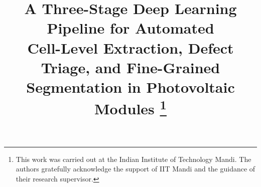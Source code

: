 \documentclass[conference]{IEEEtran}
\begin{document}
\title{A Three-Stage Deep Learning Pipeline for Automated\\
Cell-Level Extraction, Defect Triage, and Fine-Grained\\
Segmentation in Photovoltaic Modules%
\thanks{This work was carried out at the Indian Institute of
Technology Mandi. The authors gratefully acknowledge the
support of IIT Mandi and the guidance of their research
supervisor.}
}

\author{%
\and
{}
}

\maketitle
\end{document}
